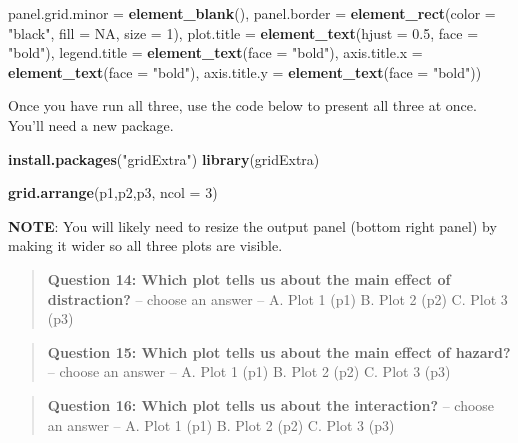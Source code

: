 \documentclass[
]{book}
\newenvironment{Shaded}{\begin{snugshade}}{\end{snugshade}}
\newcommand{\AttributeTok}[1]{\textcolor[rgb]{0.13,0.29,0.53}{#1}}
\newcommand{\ConstantTok}[1]{\textcolor[rgb]{0.56,0.35,0.01}{#1}}
\newcommand{\DecValTok}[1]{\textcolor[rgb]{0.00,0.00,0.81}{#1}}
\newcommand{\FloatTok}[1]{\textcolor[rgb]{0.00,0.00,0.81}{#1}}
\newcommand{\FunctionTok}[1]{\textcolor[rgb]{0.13,0.29,0.53}{\textbf{#1}}}
\newcommand{\NormalTok}[1]{#1}
\newcommand{\StringTok}[1]{\textcolor[rgb]{0.31,0.60,0.02}{#1}}
\begin{document}
\begin{Shaded}
\begin{Highlighting}[]
    \AttributeTok{panel.grid.minor =} \FunctionTok{element\_blank}\NormalTok{(),}
    \AttributeTok{panel.border =} \FunctionTok{element\_rect}\NormalTok{(}\AttributeTok{color =} \StringTok{"black"}\NormalTok{, }\AttributeTok{fill =} \ConstantTok{NA}\NormalTok{, }\AttributeTok{size =} \DecValTok{1}\NormalTok{),}
    \AttributeTok{plot.title =} \FunctionTok{element\_text}\NormalTok{(}\AttributeTok{hjust =} \FloatTok{0.5}\NormalTok{, }\AttributeTok{face =} \StringTok{"bold"}\NormalTok{),}
    \AttributeTok{legend.title =} \FunctionTok{element\_text}\NormalTok{(}\AttributeTok{face =} \StringTok{"bold"}\NormalTok{),}
    \AttributeTok{axis.title.x =} \FunctionTok{element\_text}\NormalTok{(}\AttributeTok{face =} \StringTok{"bold"}\NormalTok{),}
    \AttributeTok{axis.title.y =} \FunctionTok{element\_text}\NormalTok{(}\AttributeTok{face =} \StringTok{"bold"}\NormalTok{))}
\end{Highlighting}
\end{Shaded}

Once you have run all three, use the code below to present all three at once.
You'll need a new package.

\begin{Shaded}
\begin{Highlighting}[]
\FunctionTok{install.packages}\NormalTok{(}\StringTok{"gridExtra"}\NormalTok{)}
\FunctionTok{library}\NormalTok{(gridExtra)}

\FunctionTok{grid.arrange}\NormalTok{(p1,p2,p3, }\AttributeTok{ncol =} \DecValTok{3}\NormalTok{)}
\end{Highlighting}
\end{Shaded}

\textbf{NOTE}: You will likely need to resize the output panel (bottom right panel) by making it wider so all three plots are visible.

\begin{quote}
\textbf{Question 14: Which plot tells us about the main effect of distraction?} -- choose an answer -- A. Plot 1 (p1) B. Plot 2 (p2) C. Plot 3 (p3)
\end{quote}

\begin{quote}
\textbf{Question 15: Which plot tells us about the main effect of hazard?} -- choose an answer -- A. Plot 1 (p1) B. Plot 2 (p2) C. Plot 3 (p3)
\end{quote}

\begin{quote}
\textbf{Question 16: Which plot tells us about the interaction?} -- choose an answer -- A. Plot 1 (p1) B. Plot 2 (p2) C. Plot 3 (p3)
\end{quote}
\end{document}
